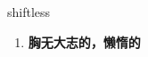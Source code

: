 
\begin{frame}
{\huge shiftless}
\begin{center}
\begin{enumerate}\Large
  \item \textbf{胸无大志的，懒惰的}
\end{enumerate}
\end{center}
\end{frame}
